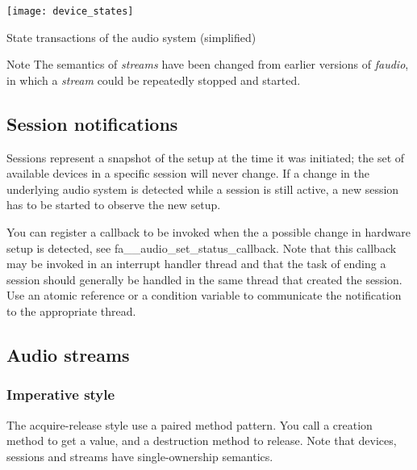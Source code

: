 \begin{DoxyImage}
\texttt{[image: device\_states]}
\caption{State transactions of the audio system (simplified)}
\end{DoxyImage}


\begin{DoxyNote}{Note}
The semantics of {\itshape streams} have been changed from earlier versions of {\itshape faudio}, in which a {\itshape stream} could be repeatedly stopped and started.
\end{DoxyNote}
\hypertarget{md__devices_Notifications}{}\subsection{Session notifications}\label{md__devices_Notifications}
Sessions represent a snapshot of the setup at the time it was initiated; the set of available devices in a specific session will never change. If a change in the underlying audio system is detected while a session is still active, a new session has to be started to observe the new setup.

You can register a callback to be invoked when the a possible change in hardware setup is detected, see fa\-\_\-\-\_\-audio\-\_\-set\-\_\-status\-\_\-callback. Note that this callback may be invoked in an interrupt handler thread and that the task of ending a session should generally be handled in the same thread that created the session. Use an atomic reference or a condition variable to communicate the notification to the appropriate thread.\hypertarget{md__devices_AudioStreams}{}\subsection{Audio streams}\label{md__devices_AudioStreams}
\hypertarget{md__devices_AudioAR}{}\subsubsection{Imperative style}\label{md__devices_AudioAR}
The acquire-\/release style use a paired method pattern. You call a creation method to get a value, and a destruction method to release. Note that devices, sessions and streams have single-\/ownership semantics.


